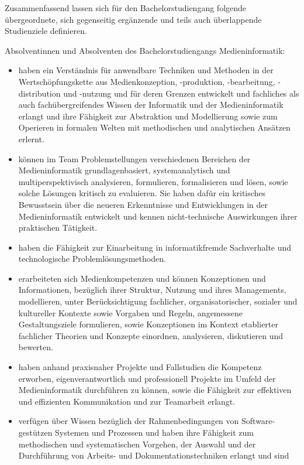 Zusammenfassend lassen sich für den Bachelorstudiengang folgende
übergeordnete, sich gegenseitig ergänzende und teils auch überlappende
Studienziele definieren.

Absolventinnen und Absolventen des Bachelorstudiengangs
Medieninformatik:

\begin{itemize}
\tightlist
\item
  haben ein Verständnis für anwendbare Techniken und Methoden in der
  Wertschöpfungskette aus Medienkonzeption, -produktion, -bearbeitung,
  -distribution und -nutzung und für deren Grenzen entwickelt und
  fachliches als auch fachübergreifendes Wissen der Informatik und der
  Medieninformatik erlangt und ihre Fähigkeit zur Abstraktion und
  Modellierung sowie zum Operieren in formalen Welten mit methodischen
  und analytischen Ansätzen erlernt.
\item
  können im Team Problemstellungen verschiedenen Bereichen der
  Medieninformatik grundlagenbasiert, systemanalytisch und
  multiperspektivisch analysieren, formulieren, formalisieren und lösen,
  sowie solche Lösungen kritisch zu evaluieren. Sie haben dafür ein
  kritisches Bewusstsein über die neueren Erkenntnisse und Entwicklungen
  in der Medieninformatik entwickelt und kennen nicht-technische
  Auswirkungen ihrer praktischen Tätigkeit.
\item
  haben die Fähigkeit zur Einarbeitung in informatikfremde Sachverhalte
  und technologische Problemlösungsmethoden.
\item
  erarbeiteten sich Medienkompetenzen und können Konzeptionen und
  Informationen, bezüglich ihrer Struktur, Nutzung und ihres
  Managements, modellieren, unter Berücksichtigung fachlicher,
  organisatorischer, sozialer und kultureller Kontexte sowie Vorgaben
  und Regeln, angemessene Gestaltungsziele formulieren, sowie
  Konzeptionen im Kontext etablierter fachlicher Theorien und Konzepte
  einordnen, analysieren, diskutieren und bewerten.
\item
  haben anhand praxisnaher Projekte und Fallstudien die Kompetenz
  erworben, eigenverantwortlich und professionell Projekte im Umfeld der
  Medieninformatik durchführen zu können, sowie die Fähigkeit zur
  effektiven und effizienten Kommunikation und zur Teamarbeit erlangt.
\item
  verfügen über Wissen bezüglich der Rahmenbedingungen von
  Software-gestützen Systemen und Prozessen und haben ihre Fähigkeit zum
  methodischen und systematischen Vorgehen, der Auswahl und der
  Durchführung von Arbeits- und Dokumentationstechniken erlangt und sind

\end{itemize}
